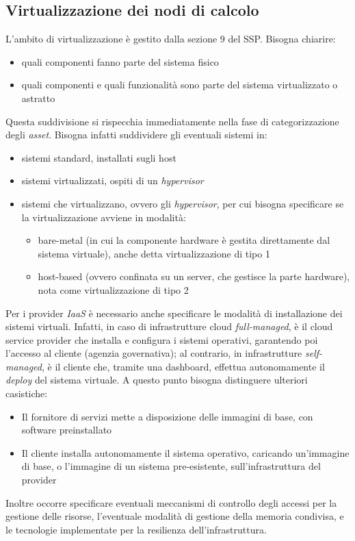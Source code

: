\documentclass[../main.tex]{subfiles}
\begin{document}
\subsection{Virtualizzazione dei nodi di calcolo}
L'ambito di virtualizzazione è gestito dalla sezione 9 del SSP. Bisogna chiarire:
\begin{itemize}
    \item quali componenti fanno parte del sistema fisico
    \item quali componenti e quali funzionalità sono parte del sistema virtualizzato o astratto
\end{itemize}
Questa suddivisione si rispecchia immediatamente nella fase di categorizzazione degli \textit{asset}. Bisogna infatti suddividere gli eventuali sistemi in:
\begin{itemize}
    \item sistemi standard, installati sugli host
    \item sistemi virtualizzati, ospiti di un \textit{hypervisor}
    \item sistemi che virtualizzano, ovvero gli \textit{hypervisor}, per cui bisogna specificare se la virtualizzazione avviene in modalità:
        \begin{itemize}
            \item bare-metal (in cui la componente hardware è gestita direttamente dal sistema virtuale), anche detta virtualizzazione di tipo 1
            \item host-based (ovvero confinata su un server, che gestisce la parte hardware), nota come virtualizzazione di tipo 2
        \end{itemize} 
\end{itemize}
Per i provider \textit{IaaS} è necessario anche specificare le modalità di installazione dei sistemi virtuali. Infatti, in caso di infrastrutture cloud \textit{full-managed}, è il cloud service provider che installa e configura i sistemi operativi, garantendo poi l'accesso al cliente (agenzia governativa); al contrario, in infrastrutture \textit{self-managed}, è il cliente che, tramite una dashboard, effettua autonomamente il \textit{deploy} del sistema virtuale. A questo punto bisogna distinguere ulteriori casistiche:
\begin{itemize}
    \item Il fornitore di servizi mette a disposizione delle immagini di base, con software preinstallato
    \item Il cliente installa autonomamente il sistema operativo, caricando un'immagine di base, o l'immagine di un sistema pre-esistente, sull'infrastruttura del provider
\end{itemize}
Inoltre occorre specificare eventuali meccanismi di controllo degli accessi per la gestione delle risorse, l'eventuale modalità di gestione della memoria condivisa, e le tecnologie implementate per la resilienza dell'infrastruttura.
\end{document}
